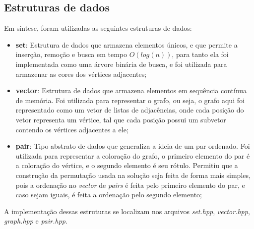 \documentclass{article}
\begin{document}
\subsection{Estruturas de dados}

Em síntese, foram utilizadas as seguintes estruturas de dados:

\begin{itemize}
    \item \textbf{set}: Estrutura de dados que armazena elementos únicos, e que permite a inserção, remoção e busca em tempo $O(log(n))$, 
    para tanto ela foi implementada como uma árvore binária de busca, e foi utilizada para armazenar as cores dos vértices adjacentes;    

    \item \textbf{vector}: Estrutura de dados que armazena elementos em sequência contínua de memória. Foi utilizada para representar o grafo, 
    ou seja, o grafo aqui foi representado como um vetor de listas de adjacências, onde cada posição do vetor representa um vértice, tal que cada 
    posição possui um subvetor contendo os vértices adjacentes a ele;

    \item \textbf{pair}: Tipo abstrato de dados que generaliza a ideia de um par ordenado. Foi utilizada para representar a coloração do grafo, 
    o primeiro elemento do par é a coloração do vértice, e o segundo elemento é seu rótulo. Permitiu que a construção da permutação usada na solução seja 
    feita de forma mais simples, pois a ordenação no \emph{vector} de \emph{pairs} é feita pelo primeiro elemento do par, e caso sejam iguais, é feita a ordenação pelo segundo elemento;

\end{itemize}

A implementação dessas estruturas se localizam nos arquivos \emph{set.hpp}, \emph{vector.hpp}, \emph{graph.hpp} e \emph{pair.hpp}.
\end{document}
